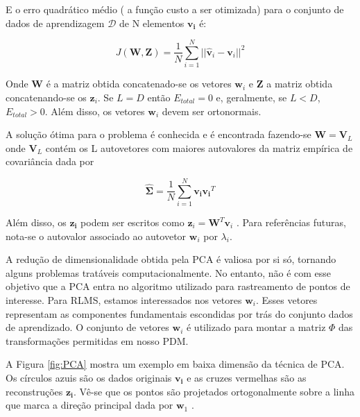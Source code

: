 {E o erro quadrático médio ( a função custo a ser otimizada) para o conjunto de dados de aprendizagem $\mathcal{D}$ de N elementos $\mathbf{v_i}$ é:

\begin{equation}
J(\mathbf{W}, \mathbf{Z} ) = \frac{1}{N}\sum_{i=1}^N ||\mathbf{\hat{v}}_{i} - \mathbf{v}_i||^2
\end{equation}

Onde $\mathbf{W}$ é a matriz obtida concatenado-se os vetores $\mathbf{w}_i$ e $\mathbf{Z}$ a matriz obtida concatenando-se os $\mathbf{z}_i$. Se $L = D$ então $E_{total} = 0$ e, geralmente, se $L < D$, $E_{total} > 0$.  Além disso, os vetores $\mathbf{w}_i$ devem ser ortonormais.

A solução ótima para o problema é conhecida e é encontrada fazendo-se $\mathbf{W} = \mathbf{V}_L$ onde $\mathbf{V}_L$ contém os L autovetores com maiores autovalores da matriz empírica de covariância dada por 

\begin{equation}
\hat{\mathbf{\Sigma}} = \frac{1}{N}\sum_{i=1}^{N} \mathbf{v_i}\mathbf{v_i}^T
\end{equation}

Além disso, os $\mathbf{z_i}$ podem ser escritos como $\mathbf{z}_i = \mathbf{W}^T \mathbf{v}_i$ \cite{machine-learning-book}. Para referências futuras, nota-se o autovalor associado ao autovetor $\mathbf{w}_i$ por $\lambda_i$.

A redução de dimensionalidade obtida pela PCA é valiosa por si só, tornando
alguns problemas tratáveis computacionalmente. No entanto, não é com esse
objetivo que a PCA entra no algoritmo utilizado para rastreamento de pontos de
interesse. Para  RLMS, estamos interessados nos vetores $\mathbf{w}_i$. Esses vetores representam as componentes
fundamentais escondidas por trás do conjunto dados de aprendizado. O conjunto
de vetores $\mathbf{w}_i$ é utilizado para montar a matriz $\Phi$ das transformações
permitidas em nosso PDM.

A Figura \ref{fig:PCA} mostra um exemplo em baixa dimensão da técnica de PCA. Os círculos azuis são os dados originais $\mathbf{v_i}$ e as cruzes vermelhas são as reconstruções $\mathbf{z_i}$. Vê-se que os pontos são projetados ortogonalmente sobre a linha que marca a direção principal dada por $\mathbf{w}_1$ \cite{machine-learning-book}.


}
